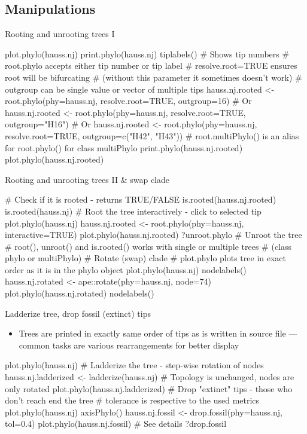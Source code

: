 \documentclass[compress, xelatex, 11pt, xcolor=svgnames, aspectratio=169,
	hyperref={
		bookmarks=true,
		unicode=true,
		colorlinks=true,
		pdftitle={Molecular data in R},
		plainpages=false,
		pdfauthor={Vojtech Zeisek},
		pdfsubject={Course about phylogeny and evolution in R},
		pdfcreator={XeLaTeX},
		pdfkeywords={R, evolution, phylogeny, molecular data},
		linkcolor=Crimson, %
		anchorcolor=Magenta, %
		citecolor=Magenta, %
		filecolor=Magenta, %
		menucolor=Magenta, %
		urlcolor=DodgerBlue, %
		},
	url={hyphens, lowtilde} %
	]{beamer}
\begin{document}
\subsection{Manipulations}

\begin{frame}[fragile]{Rooting and unrooting trees I}
	\begin{spluscode}
    plot.phylo(hauss.nj)
    print.phylo(hauss.nj)
    tiplabels() # Shows tip numbers
    # root.phylo accepts either tip number or tip label
    # resolve.root=TRUE ensures root will be bifurcating
    # (without this parameter it sometimes doesn't work)
    # outgroup can be single value or vector of multiple tips
    hauss.nj.rooted <- root.phylo(phy=hauss.nj, resolve.root=TRUE,
      outgroup=16) # Or
    hauss.nj.rooted <- root.phylo(phy=hauss.nj, resolve.root=TRUE,
      outgroup="H16") # Or
    hauss.nj.rooted <- root.phylo(phy=hauss.nj, resolve.root=TRUE,
      outgroup=c("H42", "H43"))
    # root.multiPhylo() is an alias for root.phylo() for class multiPhylo
    print.phylo(hauss.nj.rooted)
    plot.phylo(hauss.nj.rooted)
	\end{spluscode}
\end{frame}

\begin{frame}[fragile]{Rooting and unrooting trees II \& swap clade}
	\begin{spluscode}
    # Check if it is rooted - returns TRUE/FALSE
    is.rooted(hauss.nj.rooted)
    is.rooted(hauss.nj)
    # Root the tree interactively - click to selected tip
    plot.phylo(hauss.nj)
    hauss.nj.rooted <- root.phylo(phy=hauss.nj, interactive=TRUE)
    plot.phylo(hauss.nj.rooted)
    ?unroot.phylo # Unroot the tree
    # root(), unroot() and is.rooted() works with single or multiple trees
    # (class phylo or multiPhylo)
    # Rotate (swap) clade
    # plot.phylo plots tree in exact order as it is in the phylo object
    plot.phylo(hauss.nj)
    nodelabels()
    hauss.nj.rotated <- ape::rotate(phy=hauss.nj, node=74)
    plot.phylo(hauss.nj.rotated)
    nodelabels()
	\end{spluscode}
\end{frame}

\begin{frame}[fragile]{Ladderize tree, drop fossil (extinct) tips}
	\begin{itemize}
		\item Trees are printed in exactly same order of tips as is written in source file --- common tasks are various rearrangements for better display
	\end{itemize}
	\begin{spluscode}
    plot.phylo(hauss.nj)
    # Ladderize the tree - step-wise rotation of nodes
    hauss.nj.ladderized <- ladderize(hauss.nj)
    # Topology is unchanged, nodes are only rotated
    plot.phylo(hauss.nj.ladderized)
    # Drop "extinct" tips - those who don't reach end the tree
    # tolerance is respective to the used metrics
    plot.phylo(hauss.nj)
    axisPhylo()
    hauss.nj.fossil <- drop.fossil(phy=hauss.nj, tol=0.4)
    plot.phylo(hauss.nj.fossil)
    # See details
    ?drop.fossil
	\end{spluscode}
\end{frame}
\end{document}
